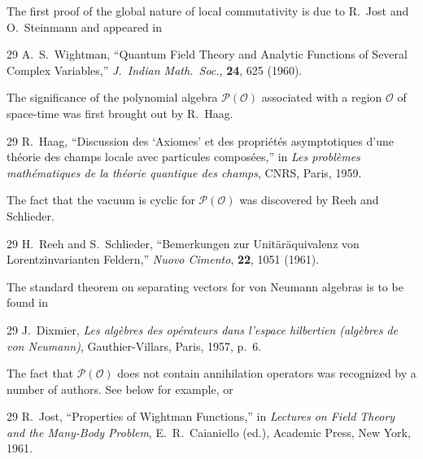 \chapterbibliography
\begingroup
\small
\setlength{\emergencystretch}{2em}
\providecommand{\bibsection}{}
\renewcommand{\bibsection}{}

The first proof of the global nature of local commutativity is due to R.~Jost
and O.~Steinmann and appeared in

\begin{thebibliography}{29}
\setcounter{NAT@ctr}{0}
 A.~S.~Wightman, ``Quantum Field Theory and Analytic Functions of
Several Complex Variables,'' \emph{J.~Indian Math.~Soc.}, \textbf{24}, 625
(1960).
\end{thebibliography}

The significance of the polynomial algebra \(\mathcal{P}(\mathcal{O})\)
associated with a region \(\mathcal{O}\) of space-time was first brought out
by R.~Haag.

\begin{thebibliography}{29}
\setcounter{NAT@ctr}{1}
 R.~Haag, ``Discussion des `Axiomes' et des propri\'et\'es
asymptotiques d'une th\'eorie des champs locale avec particules compos\'ees,''
in \emph{Les probl\`emes math\'ematiques de la th\'eorie quantique des
champs}, CNRS, Paris, 1959.
\end{thebibliography}

The fact that the vacuum is cyclic for \(\mathcal{P}(\mathcal{O})\) was
discovered by Reeh and Schlieder.

\begin{thebibliography}{29}
\setcounter{NAT@ctr}{2}
 H.~Reeh and S.~Schlieder, ``Bemerkungen zur Unit\"ar\"aquivalenz
von Lorentzinvarianten Feldern,'' \emph{Nuovo Cimento}, \textbf{22}, 1051
(1961).
\end{thebibliography}

The standard theorem on separating vectors for von Neumann algebras is to be
found in

\begin{thebibliography}{29}
\setcounter{NAT@ctr}{3}
 J.~Dixmier, \emph{Les alg\`ebres des op\'erateurs dans l'espace
hilbertien (alg\`ebres de von Neumann)}, Gauthier-Villars, Paris, 1957, p.~6.
\end{thebibliography}

The fact that \(\mathcal{P}(\mathcal{O})\) does not contain annihilation
operators was recognized by a number of authors. See \cite{ch4-16} below for
example, or

\begin{thebibliography}{29}
\setcounter{NAT@ctr}{4}
 R.~Jost, ``Properties of Wightman Functions,'' in \emph{Lectures on
Field Theory and the Many-Body Problem}, E.~R.~Caianiello (ed.), Academic
Press, New York, 1961.
\end{thebibliography}

